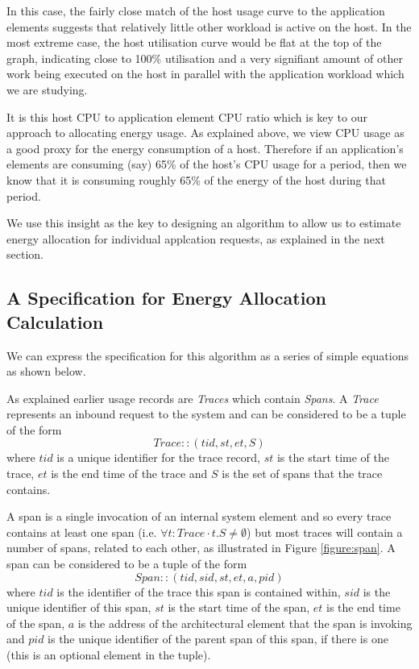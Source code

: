 In this case, the fairly close match of the host usage curve to the application elements suggests that relatively little other workload is active on the host.  In the most extreme case, the host utilisation curve would be flat at the top of the graph, indicating close to 100\% utilisation and a very signifiant amount of other work being executed on the host in parallel with the application workload which we are studying.

It is this host CPU to application element CPU ratio which is key to our approach to allocating energy usage.  As explained above, we view CPU usage as a good proxy for the energy consumption of a host.  Therefore if an application's elements are consuming (say) 65\% of the host's CPU usage for a period, then we know that it is consuming roughly 65\% of the energy of the host during that period.

We use this insight as the key to designing an algorithm to allow us to estimate energy allocation for individual applcation requests, as explained in the next section.


\subsection{A Specification for Energy Allocation Calculation}
\label{subsection:calculation-specification}


We can express the specification for this algorithm as a series of simple equations as shown below.

As explained earlier usage records are \emph{Traces} which contain \emph{Spans}.  A \emph{Trace} represents an inbound request to the system and can be considered to be a tuple of the form 
\begin{equation}
Trace :: (tid, st, et, S)
\end{equation}
where $tid$ is a unique identifier for the trace record, $st$ is the start time of the trace, $et$ is the end time of the trace and $S$ is the set of spans that the trace contains.  

A span is a single invocation of an internal system element and so every trace contains at least one span (i.e. $\forall t : Trace \cdot t.S \neq \emptyset$) but most traces will contain a number of spans, related to each other, as illustrated in Figure \ref{figure:span}.  A span can be considered to be a tuple of the form
\begin{equation}
Span :: (tid, sid, st, et, a, pid)
\end{equation}
where $tid$ is the identifier of the trace this span is contained within, $sid$ is the unique identifier of this span, $st$ is the start time of the span, $et$ is the end time of the span, $a$ is the address of the architectural element that the span is invoking and $pid$ is the unique identifier of the parent span of this span, if there is one (this is an optional element in the tuple).

